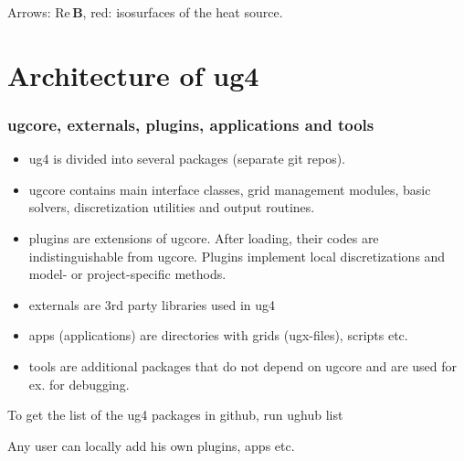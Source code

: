 \documentclass[xcolor=dvipsnames]{beamer}
\begin{document}
\begin {frame} [t]
{ \centerline{Arrows: $\mathrm{Re}\, \boldsymbol{\mathbf{B}}$, red: isosurfaces of the heat source.}
}
\end {frame}

\section {Architecture of ug4}

\begin {frame} [t]
\frametitle {ugcore, externals, plugins, applications and tools}
\vspace {-2ex}
\begin {itemize}
	\item ug4 is divided into several packages (separate git repos).
	\pause
	\item {\color{blue} ugcore} contains  main interface classes,  grid management modules,
		basic solvers, discretization utilities and output routines.
	\pause
	\item {\color{blue} plugins} are extensions of ugcore. After loading, their
		codes are indistinguishable from ugcore. Plugins implement local discretizations
		and model- or project-specific methods.
	\pause
	\item {\color{blue} externals} are 3rd party libraries used in ug4
	\pause
	\item {\color{blue} apps} (applications) are directories with grids (ugx-files), scripts etc.
	\pause
	\item {\color{blue} tools} are additional packages that do not depend on ugcore and are used for ex.
		for debugging.
\end {itemize}

\pause
\centerline {To get the list of the ug4 packages in github, run {\color{blue} ughub list}}

\pause
\centerline {Any user can {\color{blue} locally} add his own plugins, apps etc.}
\end {frame}
\end{document}
